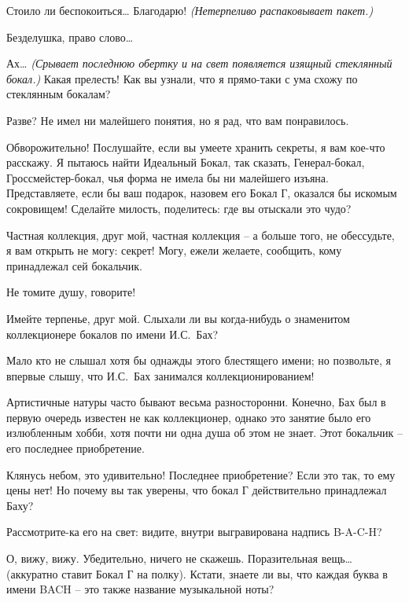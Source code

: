 \documentclass[../main.tex]{subfiles}
\begin{document}
\begin{dialogue}
 {\Large С}тоило ли беспокоиться\ldots{} Благодарю! \emph{(Нетерпеливо распаковывает пакет.)}

 {\Large Б}езделушка, право слово\ldots{}

 Ах\ldots{} \emph{(Срывает последнюю обертку и на свет появляется изящный стеклянный бокал.)} Какая прелесть! Как вы узнали, что я прямо-таки с ума схожу по стеклянным бокалам?

 Разве? Не имел ни малейшего понятия, но я рад, что вам понравилось.

 Обворожительно! Послушайте, если вы умеете хранить секреты, я вам кое-что расскажу. Я пытаюсь найти Идеальный Бокал, так сказать, Генерал-бокал, Гроссмейстер-бокал, чья форма не имела бы ни малейшего изъяна. Представляете, если бы ваш подарок, назовем его Бокал Г, оказался бы искомым сокровищем! Сделайте милость, поделитесь: где вы отыскали это чудо?

 Частная коллекция, друг мой, частная коллекция \--- а больше того, не обессудьте, я вам открыть не могу: секрет! Могу, ежели желаете, сообщить, кому принадлежал сей бокальчик.

 Не томите душу, говорите!

 Имейте терпенье, друг мой. Слыхали ли вы когда-нибудь о знаменитом коллекционере бокалов по имени И.С.~Бах?

 Мало кто не слышал хотя бы однажды этого блестящего имени; но позвольте, я впервые слышу, что И.С.~Бах занимался коллекционированием!

 {\Large А}ртистичные натуры часто бывают весьма разносторонни. Конечно, Бах был в первую очередь известен не как коллекционер, однако это занятие было его излюбленным хобби, хотя почти ни одна душа об этом не знает. Этот бокальчик \--- его последнее приобретение.

 Клянусь небом, это удивительно! Последнее приобретение? Если это так, то ему цены нет! Но почему вы так уверены, что бокал Г действительно принадлежал Баху?

 Рассмотрите-ка его на свет: видите, внутри выгравирована надпись \mbox{B-A-C-H}?

 О, вижу, вижу. Убедительно, ничего не скажешь. Поразительная вещь\ldots{} (аккуратно ставит Бокал Г на полку). Кстати, знаете ли вы, что каждая буква в имени BACH \--- это также название музыкальной ноты?


\end{dialogue}
\end{document}
